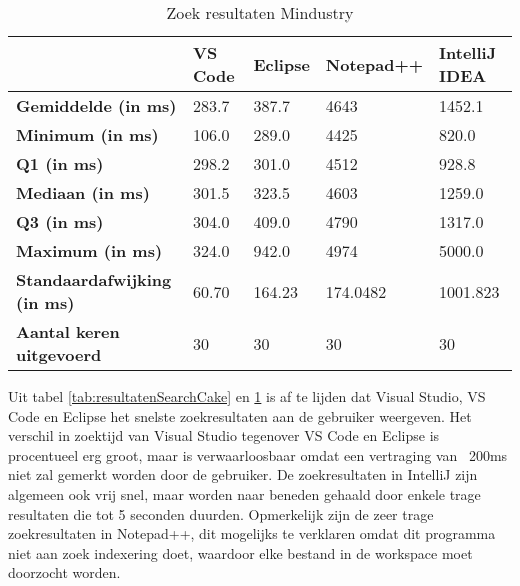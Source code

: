 \begin{table}[h!]
	\centering
	\begin{tabular}{ l l l l l }
		\hline
		                                    & \textbf{VS Code} & \textbf{Eclipse} & \textbf{Notepad++} & \textbf{IntelliJ IDEA} \\
		\hline
		\textbf{Gemiddelde (in ms)}         & 283.7            & 387.7            & 4643               & 1452.1                 \\[1ex]

		\textbf{Minimum (in ms) }           & 106.0            & 289.0            & 4425               & 820.0                  \\
		\textbf{Q1 (in ms)}                 & 298.2            & 301.0            & 4512               & 928.8                  \\
		\textbf{Mediaan (in ms)}            & 301.5            & 323.5            & 4603               & 1259.0                 \\
		\textbf{Q3 (in ms)}                 & 304.0            & 409.0            & 4790               & 1317.0                 \\
		\textbf{Maximum (in ms)}            & 324.0            & 942.0            & 4974               & 5000.0                 \\[1ex]

		\textbf{Standaardafwijking (in ms)} & 60.70            & 164.23           & 174.0482           & 1001.823               \\
		\textbf{Aantal keren uitgevoerd}    & 30               & 30               & 30                 & 30                     \\
		\hline
	\end{tabular}
	\caption{Zoek resultaten Mindustry}
	\label{tab:resultatenSearchMindustry}
\end{table}

Uit tabel \ref{tab:resultatenSearchCake} en \ref{tab:resultatenSearchMindustry} is af te lijden dat Visual Studio, VS Code en Eclipse het snelste zoekresultaten aan de gebruiker weergeven. Het verschil in zoektijd van Visual Studio tegenover VS Code en Eclipse is procentueel erg groot, maar is verwaarloosbaar omdat een vertraging van ~200ms niet zal gemerkt worden door de gebruiker. De zoekresultaten in IntelliJ zijn algemeen ook vrij snel, maar worden naar beneden gehaald door enkele trage resultaten die tot 5 seconden duurden. Opmerkelijk zijn de zeer trage zoekresultaten in Notepad++, dit mogelijks te verklaren omdat dit programma niet aan zoek indexering doet, waardoor elke bestand in de workspace moet doorzocht worden.

